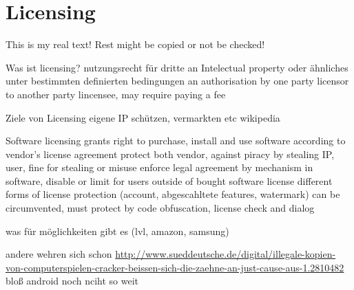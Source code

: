 \section{Licensing} \label{section:introduction-licensing}
This is my real text! Rest might be copied or not be checked!


%
Was ist licensing?
nutzungsrecht für dritte an Intelectual property oder ähnliches unter bestimmten definierten bedingungen
an authorisation by one party licensor to another party lincensee, may require paying a fee
\newline

Ziele von Licensing
eigene IP schützen, vermarkten etc
\newline
wikipedia
%

%
Software licensing grants right to purchase, install and use software according to vendor's license agreement
protect both vendor, against piracy by stealing IP, user, fine for stealing or misuse
enforce legal agreement by mechanism in software, disable or limit for users outside of bought software license
different forms of license protection (account, abgescahltete features, watermark)
can be circumvented, must protect by code obfuscation, license check and dialog
\cite{munteanLicense}
%



was für möglichkeiten gibt es (lvl, amazon, samsung)\newline

andere wehren sich schon \url{http://www.sueddeutsche.de/digital/illegale-kopien-von-computerspielen-cracker-beissen-sich-die-zaehne-an-just-cause-aus-1.2810482} bloß android noch nciht so weit
